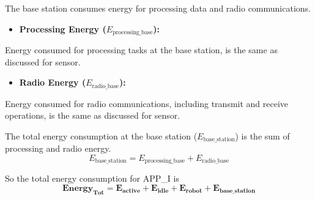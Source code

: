 \documentclass{article}
\begin{document}
The base station consumes energy for processing data and radio communications.
\begin{itemize}
    \item \textbf{Processing Energy ($E_{\text{processing\_base}}$):}
\end{itemize}
Energy consumed for processing tasks at the base station, is the same as discussed for sensor.
\begin{itemize}
    \item \textbf{Radio Energy ($E_{\text{radio\_base}}$):}
\end{itemize}
Energy consumed for radio communications, including transmit and receive operations, is the same as discussed for sensor.

The total energy consumption at the base station ($E_{\text{base\_station}}$) is the sum of processing and radio energy.
\[
E_{\text{base\_station}} = E_{\text{processing\_base}} + E_{\text{radio\_base}}
\]

So the total energy consumption for APP\_I is
\[
\mathbf{Energy_{\text{Tot}}} = \mathbf{E_{\text{active}}} + \mathbf{E_{\text{idle}}} + \mathbf{E_{\text{robot}}} + \mathbf{E_{\text{base\_station}}}
\]
\end{document}
